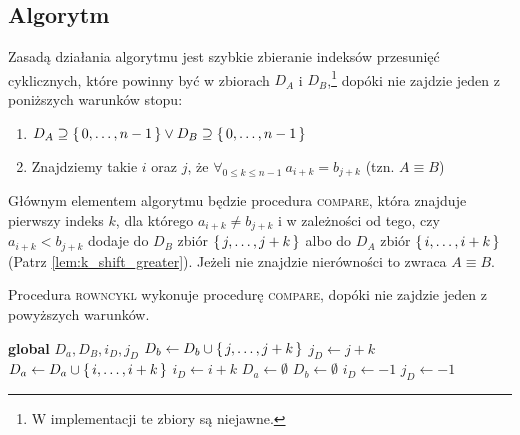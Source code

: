 \documentclass{scrartcl}
\theoremstyle{definition}
\theoremstyle{plain}
\theoremstyle{remark}
\theoremstyle{plain}
\theoremstyle{definition}
\theoremstyle{plain}
\begin{document}
\subsection{Algorytm}
Zasadą działania algorytmu jest szybkie zbieranie indeksów
przesunięć cyklicznych, które powinny być
w zbiorach \(D_A\) i \(D_B\),\footnote{
	W implementacji te zbiory są niejawne.
}
dopóki nie zajdzie jeden z poniższych warunków stopu:
\begin{enumerate}[label=(\arabic*)]
	\item \label{term_cond_1} \(D_A\supseteq\set{0,\dots,n-1}
	      \lor D_B\supseteq\set{0,\dots,n-1}\)
	\item \label{term_cond_2}Znajdziemy takie \(i\) oraz \(j\),
	      że \(\forall_{0\le k\le n-1}\ a_{i+k}=b_{j+k}\)
	      (tzn. \(A\equiv B\))
\end{enumerate}
Głównym elementem algorytmu będzie procedura \textsc{compare},
która znajduje pierwszy indeks \(k\),
dla którego \(a_{i+k}\neq b_{j+k}\)
i w zależności od tego, czy
\(a_{i+k}<b_{j+k}\)
dodaje do \(D_B\) zbiór \(\set{j,\dots,j+k}\)
albo do \(D_A\) zbiór \(\set{i,\dots,i+k}\)
(Patrz \cref{lem:k_shift_greater}).
Jeżeli nie znajdzie nierówności to zwraca \(A\equiv B\).

Procedura \textsc{rowncykl} wykonuje procedurę
\textsc{compare}, dopóki nie zajdzie jeden z powyższych warunków.
\pagebreak

\begin{algorithmic}
	\State \textbf{global} \(D_a, D_B, i_D, j_D\)
	\State \(D_b\gets D_b\cup\set{j,\dots,j+k}\)
	\State \(j_D\gets j+k\)
	\Else
	\State \(D_a\gets D_a\cup\set{i,\dots,i+k}\)
	\State \(i_D\gets i+k\)
	\EndIf
	\State \Return
	\EndIf
	\EndFor
	\State {}
	\EndProcedure
	\State \(D_a\gets \emptyset\)
	\State \(D_b\gets \emptyset\)
	\State \(i_D\gets -1\)
	\State \(j_D\gets -1\)
	\State {}
	\EndIf
	\EndWhile
	\State {}
	\EndProcedure
\end{algorithmic}
\pagebreak
\end{document}

